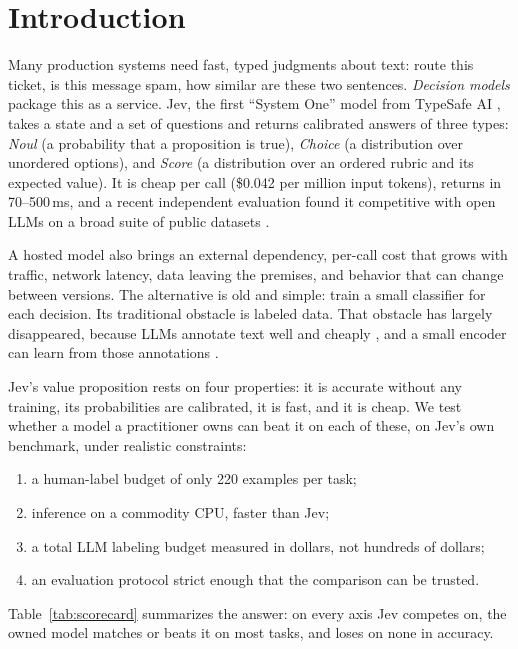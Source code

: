 \documentclass[11pt]{article}
\begin{document}
\section{Introduction}
Many production systems need fast, typed judgments about text: route this ticket, is this message spam, how similar are these two sentences.
\emph{Decision models} package this as a service.
Jev, the first ``System One'' model from TypeSafe AI \citep{typesafe2026jev}, takes a state and a set of questions and returns calibrated answers of three types: \emph{Noul} (a probability that a proposition is true), \emph{Choice} (a distribution over unordered options), and \emph{Score} (a distribution over an ordered rubric and its expected value).
It is cheap per call (\$0.042 per million input tokens), returns in 70--500\,ms, and a recent independent evaluation found it competitive with open LLMs on a broad suite of public datasets \citep{deusser2026jev}.

A hosted model also brings an external dependency, per-call cost that grows with traffic, network latency, data leaving the premises, and behavior that can change between versions.
The alternative is old and simple: train a small classifier for each decision.
Its traditional obstacle is labeled data.
That obstacle has largely disappeared, because LLMs annotate text well and cheaply \citep{wang2021want,gilardi2023chatgpt}, and a small encoder can learn from those annotations \citep{hinton2015distilling}.

Jev's value proposition rests on four properties: it is accurate without any training, its probabilities are calibrated, it is fast, and it is cheap.
We test whether a model a practitioner owns can beat it on each of these, on Jev's own benchmark, under realistic constraints:
\begin{enumerate}
  \item a human-label budget of only 220 examples per task;
  \item inference on a commodity CPU, faster than Jev;
  \item a total LLM labeling budget measured in dollars, not hundreds of dollars;
  \item an evaluation protocol strict enough that the comparison can be trusted.
\end{enumerate}

Table~\ref{tab:scorecard} summarizes the answer: on every axis Jev competes on, the owned model matches or beats it on most tasks, and loses on none in accuracy.
\end{document}
